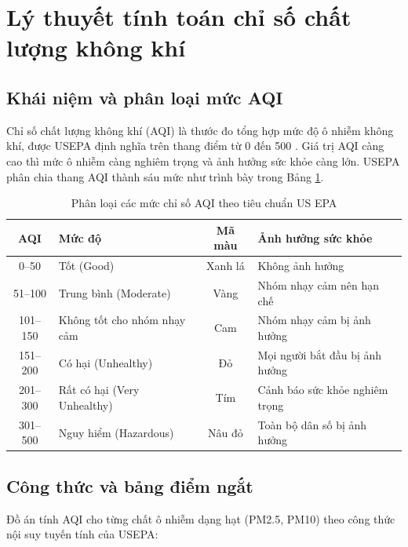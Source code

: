 \documentclass[../DoAn.tex]{subfiles}
\begin{document}
\section{Lý thuyết tính toán chỉ số chất lượng không khí}
\label{section:3.6}

\subsection{Khái niệm và phân loại mức AQI}
\label{subsection:3.6.1}

Chỉ số chất lượng không khí (\gls{AQI}) là thước đo tổng hợp mức độ ô nhiễm không khí, được \gls{USEPA} định nghĩa trên thang điểm từ 0 đến 500 \cite{usepa2018}. Giá trị \gls{AQI} càng cao thì mức ô nhiễm càng nghiêm trọng và ảnh hưởng sức khỏe càng lớn. \gls{USEPA} phân chia thang \gls{AQI} thành sáu mức như trình bày trong Bảng \ref{table:aqi_levels}.

\begin{table}[H]
\centering
\caption{Phân loại các mức chỉ số AQI theo tiêu chuẩn US EPA \cite{usepa2018}}
\label{table:aqi_levels}
\small
\begin{tabularx}{\textwidth}{|c|X|c|X|}
\hline
\textbf{AQI} & \textbf{Mức độ} & \textbf{Mã màu} & \textbf{Ảnh hưởng sức khỏe} \\
\hline
0--50 & Tốt (Good) & Xanh lá & Không ảnh hưởng \\
\hline
51--100 & Trung bình (Moderate) & Vàng & Nhóm nhạy cảm nên hạn chế \\
\hline
101--150 & Không tốt cho nhóm nhạy cảm & Cam & Nhóm nhạy cảm bị ảnh hưởng \\
\hline
151--200 & Có hại (Unhealthy) & Đỏ & Mọi người bắt đầu bị ảnh hưởng \\
\hline
201--300 & Rất có hại (Very Unhealthy) & Tím & Cảnh báo sức khỏe nghiêm trọng \\
\hline
301--500 & Nguy hiểm (Hazardous) & Nâu đỏ & Toàn bộ dân số bị ảnh hưởng \\
\hline
\end{tabularx}
\end{table}

\subsection{Công thức và bảng điểm ngắt}
\label{subsection:3.6.2}

Đồ án tính \gls{AQI} cho từng chất ô nhiễm dạng hạt (PM2.5, PM10) theo công thức nội suy tuyến tính của \gls{USEPA}:
\end{document}
